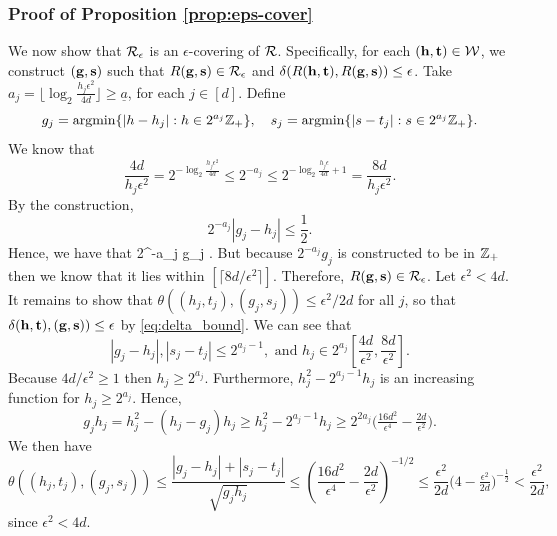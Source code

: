 \documentclass[twoside,11pt]{article}
\begin{document}
\subsubsection{Proof of Proposition \ref{prop:eps-cover}}
We now show that $\mathcal{R}_\epsilon$ is an $\epsilon$-covering of $\mathcal{R}$.
Specifically, for each $(\mathbf{h},\mathbf{t}) \in \mathcal{W}$, we construct $(\mathbf{g},\mathbf{s})$ such that $R(\mathbf{g},\mathbf{s}) \in \mathcal{R}_\epsilon$ and $\delta(R(\mathbf{h},\mathbf{t}), R(\mathbf{g},\mathbf{s})) \le \epsilon$.
Take $a_j = \lfloor \log_2 \frac{h_j \epsilon^2}{4d} \rfloor \ge \underline a$, for each $j \in [d]$.
Define
\[
g_j = \mathop{\mathrm{argmin}}\{ |h - h_j| : h \in 2^{a_j} \mathbb{Z}_+\}, \quad
s_j = \mathop{\mathrm{argmin}}\{ |s - t_j| : s \in 2^{a_j} \mathbb{Z}_+\}.
\]
We know that 
\[
\frac{4d}{h_j \epsilon^2} = 2^{- \log_2 \frac{h_j \epsilon^2}{4d}} \le 2^{-a_j} \le 2^{- \log_2 \frac{h_j \epsilon}{4d} + 1} = \frac{8d}{h_j \epsilon^2}.
\]
By the construction,
\[
2^{-a_j} |g_j - h_j| \le \frac 12.
\]
Hence, we have that 
\beq \label{g_int}
2^{-a_j} g_j \in {} \subseteq {}.
\eeq
But because $2^{-a_j} g_j$ is constructed to be in $\mathbb{Z}_+$ then we know that it lies within $[\lceil 8 d / \epsilon^2 \rceil]$.
Therefore, $R(\mathbf{g},\mathbf{s}) \in \mathcal{R}_\epsilon$.
Let $\epsilon^2 < 4d$.
It remains to show that $\theta((h_j,t_j),(g_j,s_j)) \le \epsilon^2 / 2d$ for all $j$, so that $\delta (\mathbf{h},\mathbf{t}),(\mathbf{g},\mathbf{s})) \le \epsilon$ by \eqref{eq:delta_bound}.  
We can see that
\[
|g_j - h_j| , |s_j - t_j| \le 2^{a_j - 1}, \textrm{ and } h_j \in 2^{a_j} \left[ \frac{4d}{\epsilon^2}, \frac{8d}{\epsilon^2} \right].
\]
Because $4d / \epsilon^2 \ge 1$ then $h_j \ge 2^{a_j}$.
Furthermore, $h_j^2 - 2^{a_j - 1} h_j$ is an increasing function for $h_j \ge 2^{a_j}$.
Hence,
\[
g_j h_j = h_j^2 - (h_j - g_j) h_j \ge h_j^2 - 2^{a_j - 1} h_j \ge 2^{2a_j} \big( \tfrac{16d^2}{\epsilon^4} - \tfrac{2d}{\epsilon^2} \big).
\]
We then have 
\[
\theta((h_j,t_j),(g_j,s_j)) \le \frac{|g_j - h_j| + |s_j - t_j|}{\sqrt{g_j h_j}} \le \left(\frac{16d^2}{\epsilon^4} - \frac{2d}{\epsilon^2} \right)^{-1/2} \le \frac{\epsilon^2}{2d} \big( 4 -  \tfrac{\epsilon^2}{2d}\big)^{-\frac 12} < \frac{\epsilon^2}{2d} ,
\]
since $\epsilon^2 < 4d$.
\end{document}
